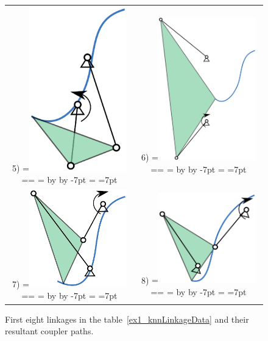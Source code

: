 \documentclass[twocolumn,10pt]{asme2e}
\makeatletter
\newcommand{\putindeepbox}[2][0.7\baselineskip]{{%
    \setbox0=\hbox{#2}%
    \setbox0=\vbox{\noindent\hsize=\wd0\unhbox0}
    \@tempdima=\dp0
    \advance\@tempdima by \ht0
    \advance\@tempdima by -#1\relax
    \dp0=\@tempdima
    \ht0=#1\relax
    \box0
}}
\makeatother
\begin{document}
\begin{figure}
\begin{tabular}{cc}
  5)\putindeepbox[7pt]{\includegraphics[width=120pt]{figure/path_solutions/path_sol5.eps}}
    & 6)\putindeepbox[7pt]{\includegraphics[width=120pt]{figure/path_solutions/path_sol6.eps}} \\
  7)\putindeepbox[7pt]{\includegraphics[width=120pt]{figure/path_solutions/path_sol7.eps}}
    & 8)\putindeepbox[7pt]{\includegraphics[width=120pt]{figure/path_solutions/path_sol8.eps}}\\
\end{tabular}
\caption{First eight linkages in the table~\ref{ex1_knnLinkageData} and their resultant coupler paths.}
\label{ex1_solns}
\end{figure}
\end{document}
